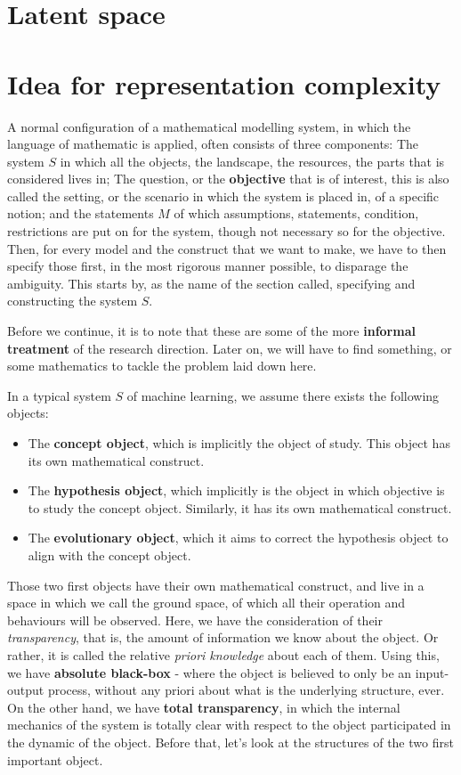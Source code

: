 \documentclass{article}
\begin{document}
\section{Latent space}

\section{Idea for representation complexity}
A normal configuration of a mathematical modelling system, in which the language of mathematic is applied, often consists of three components: The system $S$ in which all the objects, the landscape, the resources, the parts that is considered lives in; The question, or the \textbf{objective} that is of interest, this is also called the setting, or the scenario in which the system is placed in, of a specific notion; and the statements $M$ of which assumptions, statements, condition, restrictions are put on for the system, though not necessary so for the objective. Then, for every model and the construct that we want to make, we have to then specify those first, in the most rigorous manner possible, to disparage the ambiguity. This starts by, as the name of the section called, specifying and constructing the system $S$. 

Before we continue, it is to note that these are some of the more \textbf{informal treatment} of the research direction. Later on, we will have to find something, or some mathematics to tackle the problem laid down here. 

In a typical system $S$ of machine learning, we assume there exists the following objects: 

\begin{itemize}[topsep=1pt,itemsep=0.5pt]
    \item The \textbf{concept object}, which is implicitly the object of study. This object has its own mathematical construct. 
    \item The \textbf{hypothesis object}, which implicitly is the object in which objective is to study the concept object. Similarly, it has its own mathematical construct. 
    \item The \textbf{evolutionary object}, which it aims to correct the hypothesis object to align with the concept object. 
\end{itemize}
Those two first objects have their own mathematical construct, and live in a space in which we call the ground space, of which all their operation and behaviours will be observed. Here, we have the consideration of their \textit{transparency}, that is, the amount of information we know about the object. Or rather, it is called the relative \textit{priori knowledge} about each of them. Using this, we have \textbf{absolute black-box} - where the object is believed to only be an input-output process, without any priori about what is the underlying structure, ever. On the other hand, we have \textbf{total transparency}, in which the internal mechanics of the system is totally clear with respect to the object participated in the dynamic of the object. Before that, let's look at the structures of the two first important object. 
\end{document}
